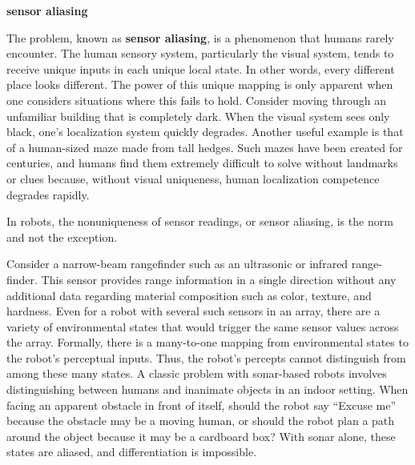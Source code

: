 \begin{framed}
\begin{remark}{\textbf{sensor aliasing}}

The problem, known as \textbf{sensor aliasing}, is a phenomenon that humans rarely encounter. 
The human sensory system, particularly the visual system, tends to receive unique inputs in each unique
local state. In other words, every different place looks different. The power of this unique
mapping is only apparent when one considers situations where this fails to hold. Consider
moving through an unfamiliar building that is completely dark. When the visual system
sees only black, one’s localization system quickly degrades. Another useful example is that
of a human-sized maze made from tall hedges. Such mazes have been created for centuries,
and humans find them extremely difficult to solve without landmarks or clues because,
without visual uniqueness, human localization competence degrades rapidly.

\end{remark}
\end{framed}

In robots, the nonuniqueness of sensor readings, or sensor aliasing, is the norm and not
the exception. 

\begin{framed}
\begin{exmp}

Consider a narrow-beam rangefinder such as an ultrasonic or infrared range-finder. 
This sensor provides range information in a single direction without any additional
data regarding material composition such as color, texture, and hardness. Even for a robot
with several such sensors in an array, there are a variety of environmental states that would
trigger the same sensor values across the array. Formally, there is a many-to-one mapping
from environmental states to the robot’s perceptual inputs. Thus, the robot’s percepts
cannot distinguish from among these many states. A classic problem with sonar-based
robots involves distinguishing between humans and inanimate objects in an indoor setting.
When facing an apparent obstacle in front of itself, should the robot say “Excuse me”
because the obstacle may be a moving human, or should the robot plan a path around the
object because it may be a cardboard box? With sonar alone, these states are aliased, and
differentiation is impossible.

\end{exmp}
\end{framed}

